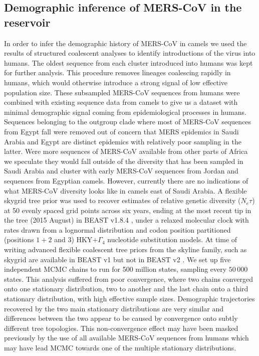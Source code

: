 \documentclass[11pt,oneside,letterpaper]{article}
\begin{document}
\subsection*{Demographic inference of MERS-CoV in the reservoir}
In order to infer the demographic history of MERS-CoV in camels we used the results of structured coalescent analyses to identify introductions of the virus into humans.
The oldest sequence from each cluster introduced into humans was kept for further analysis.
This procedure removes lineages coalescing rapidly in humans, which would otherwise introduce a strong signal of low effective population size.
These subsampled MERS-CoV sequences from humans were combined with existing sequence data from camels to give us a dataset with minimal demographic signal coming from epidemiological processes in humans.
Sequences belonging to the outgroup clade where most of MERS-CoV sequences from Egypt fall were removed out of concern that MERS epidemics in Saudi Arabia and Egypt are distinct epidemics with relatively poor sampling in the latter.
Were more sequences of MERS-CoV available from other parts of Africa we speculate they would fall outside of the diversity that has been sampled in Saudi Arabia and cluster with early MERS-CoV sequences from Jordan and sequences from Egyptian camels.
However, currently there are no indications of what MERS-CoV diversity looks like in camels east of Saudi Arabia.
A flexible skygrid tree prior \citep{gill_2013} was used to recover estimates of relative genetic diversity ($N_{e}\tau$) at 50 evenly spaced grid points across six years, ending at the most recent tip in the tree (2015 August) in BEAST v1.8.4 \citep{drummond_bayesian_2012}, under a relaxed molecular clock with rates drawn from a lognormal distribution \citep{drummond_2006} and codon position partitioned (positions $1+2$ and $3$) HKY$+\Gamma_{4}$ \citep{hky_1985,yang_1994} nucleotide substitution models.
At time of writing advanced flexible coalescent tree priors from the skyline family, such as skygrid \citep{gill_2013} are available in BEAST v1 \citep{drummond_bayesian_2012} but not in BEAST v2 \citep{bouckaert_beast_2014}.
We set up five independent MCMC chains to run for 500 million states, sampling every $50\,000$ states.
This analysis suffered from poor convergence, where two chains converged onto one stationary distribution, two to another and the last chain onto a third stationary distribution, with high effective sample sizes.
Demographic trajectories recovered by the two main stationary distributions are very similar and differences between the two appear to be caused by convergence onto subtly different tree topologies.
This non-convergence effect may have been masked previously by the use of all available MERS-CoV sequences from humans which may have lead MCMC towards one of the multiple stationary distributions.
\end{document}
